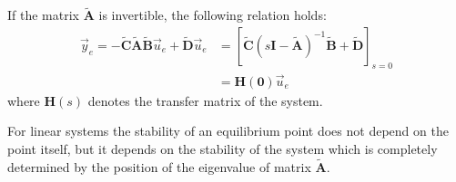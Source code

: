\documentclass[11pt,a4paper,oneside]{book}
\numberwithin{equation}{section}
\theoremstyle{it}
\theoremstyle{definition}
\begin{document}
If the matrix $\tilde{\mathbf{A}}$ is invertible, the following relation holds:
\begin{equation}\label{eq72}
	\begin{aligned}
		\vec{y}_e = 
		-\tilde{\mathbf{C}}\tilde{\mathbf{A}}\tilde{\mathbf{B}}\vec{u}_e+\tilde{\mathbf{D}}\vec{u}_e
		 &= \left[ \tilde{\mathbf{C}} \left( 
		s{\mathbf{I}}-\tilde{\mathbf{A}}\right)^{-1}\tilde{\mathbf{B}}+\tilde{\mathbf{D}}
		 \right]_{s=0} \\[8pt]
		&=\mathbf{H(0)}\vec{u}_e
	\end{aligned}
\end{equation}
where $\mathbf{H}(s)$ denotes the transfer matrix of the system.
\begin{mybox}
	For linear systems the stability of an equilibrium point does not depend on 
	the point itself, but it depends on the stability of the system which is 
	completely determined by the position of the eigenvalue of matrix 
	$\tilde{\mathbf{A}}$.
\end{mybox}
\end{document}
